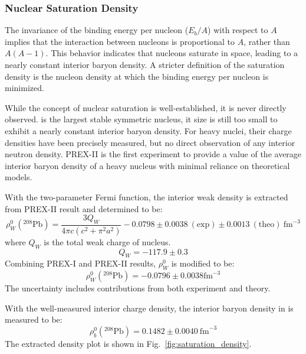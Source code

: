 \subsubsection{Nuclear Saturation Density}
The invariance of the binding energy per nucleon ($E_b/A$) with respect to $A$ implies that
the interaction between nucleons is proportional to $A$, rather than $A(A-1)$. 
This behavior indicates that nucleons saturate in space, leading to a nearly 
constant interior baryon density. 
A stricter definition of the saturation density
is the nucleon density at which the binding energy per nucleon is minimized.

While the concept of nuclear saturation is well-established, it is never directly observed.
\ca is the largest stable symmetric nucleus, it size is still too small to exhibit a nearly 
constant interior baryon density. For heavy nuclei, their charge densities have
been precisely measured, but no direct observation of any interior neutron density. 
PREX-II is the first experiment to provide a value of the average interior baryon density of 
a heavy nucleus with minimal reliance on theoretical models.

With the two-parameter Fermi function, the interior weak density is extracted 
from PREX-II result and determined to be:
\begin{equation}
    \rho_W^0({}^{208}\text{Pb}) = \frac{3Q_W}{4\pi c (c^2 + \pi^2 a^2)} 
    -0.0798 \pm 0.0038 \ (\text{exp}) \pm 0.0013 \ (\text{theo})\ \mathrm{fm}^{-3}
\end{equation}
where $Q_W$ is the total weak charge of \Pb nucleus.
\begin{equation}
    Q_W = -117.9 \pm 0.3
\end{equation}
Combining PREX-I and PREX-II results, $\rho_W^0$ is modified to be:
\begin{equation}
    \rho_W^0({}^{208}\text{Pb}) = -0.0796 \pm 0.0038 \mathrm{fm}^{-3}
\end{equation}
The uncertainty includes contributions from both experiment and theory.

With the well-measured interior charge density, the interior baryon density 
in \Pb is measured to be:
\begin{equation}
    \rho^0_b({}^{208}\text{Pb}) = 0.1482 \pm 0.0040\ \mathrm{fm}^{-3}
\end{equation}
The extracted density plot is shown in Fig.~\ref{fig:saturation_density}.

